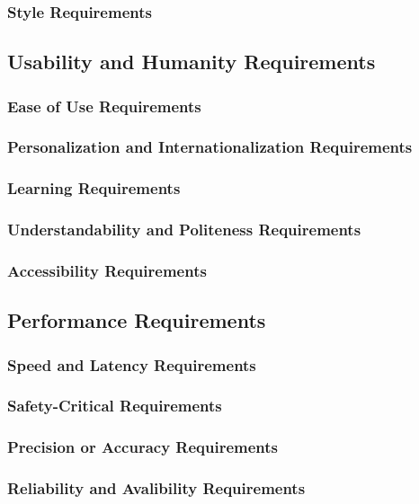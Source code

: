 \documentclass[12pt, titlepage]{article}
\begin{document}
    \subsubsection{Style Requirements}

  \subsection{Usability and Humanity Requirements}

    \subsubsection{Ease of Use Requirements}
    \subsubsection{Personalization and Internationalization Requirements}
    \subsubsection{Learning Requirements}
    \subsubsection{Understandability and Politeness Requirements}
    \subsubsection{Accessibility Requirements}

  \subsection{Performance Requirements}

    \subsubsection{Speed and Latency Requirements}
    \subsubsection{Safety-Critical Requirements}
    \subsubsection{Precision or Accuracy Requirements}
    \subsubsection{Reliability and Avalibility Requirements}
\end{document}

